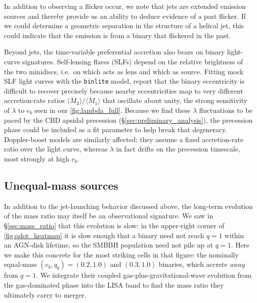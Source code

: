 \documentclass[fleqn,usenatbib]{mnras}
\begin{document}
In addition to observing a flicker occur, we note that jets are extended emission sources and thereby provide us an ability to deduce evidence of a past flicker. If we could determine a geometric separation in the structure of a helical jet, this could indicate that the emission is from a binary that flickered in the past.


Beyond jets, the time-variable preferential accretion also bears on binary light-curve signatures. Self-lensing flares (SLFs) depend on the relative brightness of the two minidiscs, i.e.\ on which acts as lens and which as source. Fitting mock SLF light curves with the \texttt{binlite} model, \citet{Park2026SLF5} report that the binary eccentricity is difficult to recover precisely because nearby eccentricities map to very different accretion-rate ratios $\langle\dot{M}_2\rangle/\langle\dot{M}_1\rangle$ that oscillate about unity, the strong sensitivity of $\lambda$ to $e_b$ seen in our \autoref{fig:lambda_full}. Because we find these $\lambda$ fluctuations to be paced by the CBD apsidal precession (\S\ref{sec:preliminary_analysis}), the precession phase could be included as a fit parameter to help break that degeneracy. Doppler-boost models \citep{dorazio_spikey, charisi_doppler} are similarly affected: they assume a fixed accretion-rate ratio over the light curve, whereas $\lambda$ in fact drifts on the precession timescale, most strongly at high $e_b$.
\subsection{Unequal-mass sources}
In addition to the jet-launching behavior discussed above, the long-term evolution of the mass ratio may itself be an observational signature. We saw in \S\ref{sec:mass_ratio} that this evolution is slow: in the upper-right corner of \autoref{fig:qdot_heatmap} it is slow enough that a binary need not reach $q = 1$ within an AGN-disk lifetime, so the SMBBH population need not pile up at $q = 1$. Here we make this concrete for the most striking cells in that figure: the nominally equal-mass $(e_b, q_b) = (0.2, 1.0)$ and $(0.3, 1.0)$ binaries, which accrete \textit{away} from $q = 1$. We integrate their coupled gas-plus-gravitational-wave evolution from the gas-dominated phase into the LISA band to find the mass ratio they ultimately carry to merger.
\end{document}
